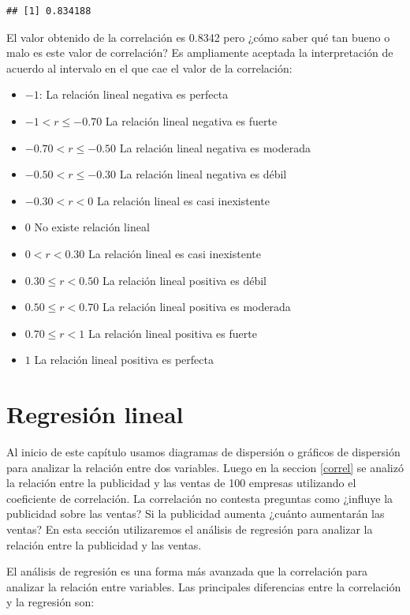 \documentclass[]{book}
\providecommand{\tightlist}{%
  \setlength{\itemsep}{0pt}\setlength{\parskip}{0pt}}
\begin{document}
\begin{verbatim}
## [1] 0.834188
\end{verbatim}

El valor obtenido de la correlación es 0.8342 pero ¿cómo saber qué tan bueno o malo es este valor de correlación? Es ampliamente aceptada la interpretación de acuerdo al intervalo en el que cae el valor de la correlación:

\begin{itemize}
\tightlist
\item
  \(-1\): La relación lineal negativa es perfecta
\item
  \(-1<r \leq -0.70\) La relación lineal negativa es fuerte
\item
  \(-0.70<r \leq -0.50\) La relación lineal negativa es moderada
\item
  \(-0.50<r \leq -0.30\) La relación lineal negativa es débil
\item
  \(-0.30<r < 0\) La relación lineal es casi inexistente
\item
  \(0\) No existe relación lineal
\item
  \(0<r < 0.30\) La relación lineal es casi inexistente
\item
  \(0.30 \leq r < 0.50\) La relación lineal positiva es débil
\item
  \(0.50 \leq r < 0.70\) La relación lineal positiva es moderada
\item
  \(0.70 \leq r < 1\) La relación lineal positiva es fuerte
\item
  \(1\) La relación lineal positiva es perfecta
\end{itemize}

\hypertarget{regresion-lineal}{%
\section{Regresión lineal}\label{regresion-lineal}}

Al inicio de este capítulo usamos diagramas de dispersión o gráficos de dispersión para analizar la relación entre dos variables. Luego en la seccion \ref{correl} se analizó la relación entre la publicidad y las ventas de 100 empresas utilizando el coeficiente de correlación. La correlación no contesta preguntas como ¿influye la publicidad sobre las ventas? Si la publicidad aumenta ¿cuánto aumentarán las ventas? En esta sección utilizaremos el análisis de regresión para analizar la relación entre la publicidad y las ventas.

El análisis de regresión es una forma más avanzada que la correlación para analizar la relación entre variables. Las principales diferencias entre la correlación y la regresión son:
\end{document}

